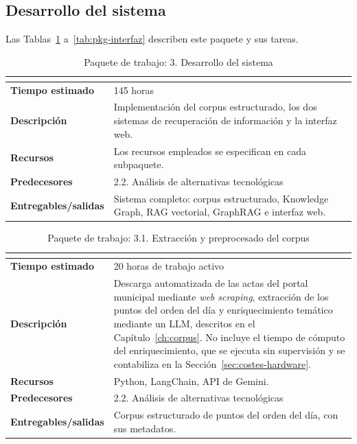 \documentclass[11pt, a4paper]{report}
\begin{document}
	\subsection{Desarrollo del sistema}

	Las Tablas~\ref{tab:pkg-desarrollo} a~\ref{tab:pkg-interfaz} describen este paquete y sus tareas.

	\begin{table}[H]
		\centering
		\begin{tabularx}{\linewidth}{|>{\bfseries}l|X|}
			\hline
			\rowcolor{pkg-desarrollo}
			\multicolumn{2}{|c|}{\textcolor{white}{\textbf{3. Desarrollo del sistema}}} \\
			\hline
			Tiempo estimado & 145 horas \\
			\hline
			\rowcolor{fila-alterna}
			Descripción & Implementación del corpus estructurado, los dos sistemas
			de recuperación de información y la interfaz web. \\
			\hline
			Recursos & Los recursos empleados se especifican en cada subpaquete. \\
			\hline
			\rowcolor{fila-alterna}
			Predecesores & 2.2. Análisis de alternativas tecnológicas \\
			\hline
			Entregables/salidas & Sistema completo: corpus estructurado, Knowledge
			Graph, RAG vectorial, GraphRAG e interfaz web. \\
			\hline
		\end{tabularx}
		\caption{Paquete de trabajo: 3. Desarrollo del sistema}
		\label{tab:pkg-desarrollo}
	\end{table}

	\begin{table}[H]
		\centering
		\begin{tabularx}{\linewidth}{|>{\bfseries}l|X|}
			\hline
			\rowcolor{pkg-desarrollo}
			\multicolumn{2}{|c|}{\textcolor{white}{\textbf{3.1. Extracción y preprocesado del corpus}}} \\
			\hline
			Tiempo estimado & 20 horas de trabajo activo \\
			\hline
			\rowcolor{fila-alterna}
			Descripción & Descarga automatizada de las actas del portal municipal mediante \textit{web scraping}, extracción de los puntos del orden del día y enriquecimiento temático mediante un LLM, descritos en el Capítulo~\ref{ch:corpus}. No incluye el tiempo de cómputo del enriquecimiento, que se ejecuta sin supervisión y se contabiliza en la Sección~\ref{sec:costes-hardware}. \\
			\hline
			Recursos & Python, LangChain, API de Gemini. \\
			\hline
			\rowcolor{fila-alterna}
			Predecesores & 2.2. Análisis de alternativas tecnológicas \\
			\hline
			Entregables/salidas & Corpus estructurado de puntos del orden del día, con sus metadatos. \\
			\hline
		\end{tabularx}
		\caption{Paquete de trabajo: 3.1. Extracción y preprocesado del corpus}
		\label{tab:pkg-extraccion}
	\end{table}
\end{document}
